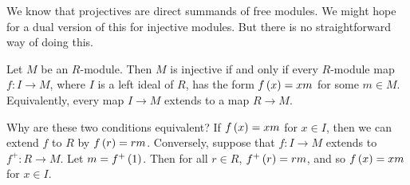 \pagebreak

We know that projectives are direct summands of free modules. We might hope for a dual version of this for injective modules. But there is no straightforward way of doing this.


\begin{proposition}
Let $ M $ be an $ R $-module. Then $ M $ is injective if and only if every $ R $-module map $ f : I \to M $, where $ I $ is a left ideal of $ R $, has the form $ f\br{x} = xm $ for some $ m \in M $. Equivalently, every map $ I \to M $ extends to a map $ R \to M $.
\end{proposition}

Why are these two conditions equivalent? If $ f\br{x} = xm $ for $ x \in I $, then we can extend $ f $ to $ R $ by $ f\br{r} = rm $. Conversely, suppose that $ f : I \to M $ extends to $ f^+ : R \to M $. Let $ m = f^+\br{1} $. Then for all $ r \in R $, $ f^+\br{r} = rm $, and so $ f\br{x} = xm $ for $ x \in I $.

